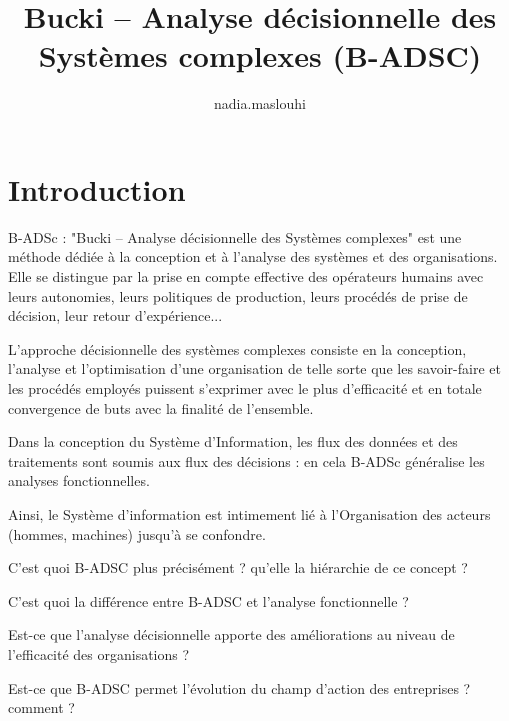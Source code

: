\documentclass{article}
\title{Bucki – Analyse décisionnelle des Systèmes complexes (B-ADSC) }
\author{nadia.maslouhi }
\begin{document}
\maketitle

\section{Introduction}


B-ADSc : "Bucki – Analyse décisionnelle des Systèmes complexes" est une méthode dédiée à la conception et à l’analyse des systèmes et des organisations. Elle se distingue par la prise en compte effective des opérateurs humains avec leurs autonomies, leurs politiques de production, leurs procédés de prise de décision, leur retour d’expérience...

L'approche décisionnelle des systèmes complexes consiste en la conception, l'analyse et l'optimisation d'une organisation de telle sorte que les savoir-faire et les procédés employés puissent s’exprimer avec le plus d'efficacité et en totale convergence de buts avec la finalité de l'ensemble.

Dans la conception du Système d’Information, les flux des données et des traitements sont soumis aux flux des décisions : en cela B-ADSc généralise les analyses fonctionnelles.

Ainsi, le Système d’information est intimement lié à l’Organisation des acteurs (hommes, machines) jusqu’à se confondre.

C’est quoi B-ADSC plus précisément ? qu’elle la hiérarchie de ce concept ?

C’est quoi la différence entre B-ADSC et l’analyse fonctionnelle ?

Est-ce que l’analyse décisionnelle apporte des améliorations au niveau de l’efficacité des organisations ?

Est-ce que B-ADSC permet l’évolution du champ d’action des entreprises ? comment ?
\end{document}
